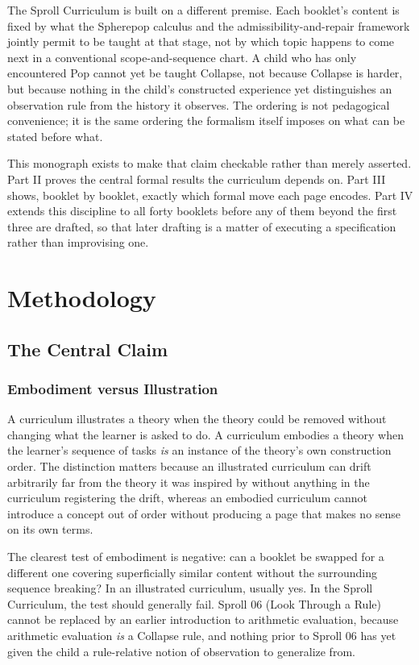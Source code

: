 \documentclass[11pt,twoside]{book}
\begin{document}
The Sproll Curriculum is built on a different premise. Each booklet's content is fixed by what the Spherepop calculus and the admissibility-and-repair framework jointly permit to be taught at that stage, not by which topic happens to come next in a conventional scope-and-sequence chart. A child who has only encountered Pop cannot yet be taught Collapse, not because Collapse is harder, but because nothing in the child's constructed experience yet distinguishes an observation rule from the history it observes. The ordering is not pedagogical convenience; it is the same ordering the formalism itself imposes on what can be stated before what.

This monograph exists to make that claim checkable rather than merely asserted. Part II proves the central formal results the curriculum depends on. Part III shows, booklet by booklet, exactly which formal move each page encodes. Part IV extends this discipline to all forty booklets before any of them beyond the first three are drafted, so that later drafting is a matter of executing a specification rather than improvising one.

\mainmatter

\part{Methodology}

\chapter{The Central Claim}

\section{Embodiment versus Illustration}

A curriculum illustrates a theory when the theory could be removed without changing what the learner is asked to do. A curriculum embodies a theory when the learner's sequence of tasks \emph{is} an instance of the theory's own construction order. The distinction matters because an illustrated curriculum can drift arbitrarily far from the theory it was inspired by without anything in the curriculum registering the drift, whereas an embodied curriculum cannot introduce a concept out of order without producing a page that makes no sense on its own terms.

The clearest test of embodiment is negative: can a booklet be swapped for a different one covering superficially similar content without the surrounding sequence breaking? In an illustrated curriculum, usually yes. In the Sproll Curriculum, the test should generally fail. Sproll 06 (Look Through a Rule) cannot be replaced by an earlier introduction to arithmetic evaluation, because arithmetic evaluation \emph{is} a Collapse rule, and nothing prior to Sproll 06 has yet given the child a rule-relative notion of observation to generalize from.
\end{document}
